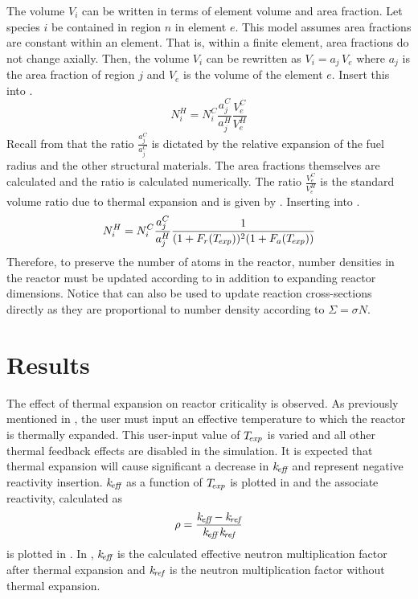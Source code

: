     The volume $V_i$ can be written in terms of element volume and area
    fraction. Let species $i$ be contained in region $n$ in element $e$. This
    model assumes area fractions are constant within an element. That is,
    within a finite element, area fractions do not change axially. Then, the
    volume $V_i$ can be rewritten as $V_i = a_j \, V_e$ where $a_j$ is the area
    fraction of region $j$ and $V_e$ is the volume of the element $e$. Insert
    this into .
    \begin{equation}
      \label{eq:nden_expansion_expanded}
      N_i^H = N_i^C \frac{a_j^C}{a_j^H} \frac{V_e^C}{V_e^H}
    \end{equation}
    Recall from  that the
    ratio $\frac{a_j^C}{a_j^C}$ is dictated by the relative expansion of the
    fuel radius and the other structural materials. The area fractions
    themselves are calculated and the ratio is calculated numerically. The ratio
    $\frac{V_e^C}{V_e^H}$ is the standard volume ratio due to thermal expansion
    and is given by . Inserting 
    into .
    \begin{equation}
      \label{eq:nden_thexp_update}
      N_i^H = N_i^C \frac{a_j^C}{a_j^H} 
        \frac{1}{(1+F_r(T_{\!\mbox{\scriptsize \em exp}}))^2 (1+F_a(T_{\!\mbox{\scriptsize \em exp}}))}
    \end{equation}
    Therefore, to preserve the number of atoms in the reactor, number densities
    in the reactor must be updated according to  in
    addition to expanding reactor dimensions. Notice that
     can also be used to update reaction 
    cross-sections directly as they are proportional to number density according
    to $\Sigma = \sigma N$.

\section{Results}
  The effect of thermal expansion on reactor criticality is observed. As
  previously mentioned in , 
  the user must input an effective temperature to which the reactor is thermally 
  expanded. This user-input value of $T_{\!\mbox{\scriptsize \em exp}}$ is varied and all other thermal 
  feedback effects are disabled in the simulation. It is expected that thermal 
  expansion will cause significant a decrease in $k_{\!\mbox{\scriptsize \em eff}}$ and represent negative 
  reactivity insertion. $k_{\!\mbox{\scriptsize \em eff}}$ as a function of $T_{\!\mbox{\scriptsize \em exp}}$ is plotted in 
   and the associate reactivity, calculated as
  \begin{equation}
    \label{eq:reactivity_formula}
    \rho = \frac{k_{\!\mbox{\scriptsize \em eff}} - k_{\!\mbox{\scriptsize \em ref}}}{k_{\!\mbox{\scriptsize \em eff}} \, k_{\!\mbox{\scriptsize \em ref}}}
  \end{equation}
  is plotted in . In
  , $k_{\!\mbox{\scriptsize \em eff}}$ is the calculated effective neutron 
  multiplication factor after thermal expansion and $k_{\!\mbox{\scriptsize \em ref}}$ is the neutron 
  multiplication factor without thermal expansion. 

